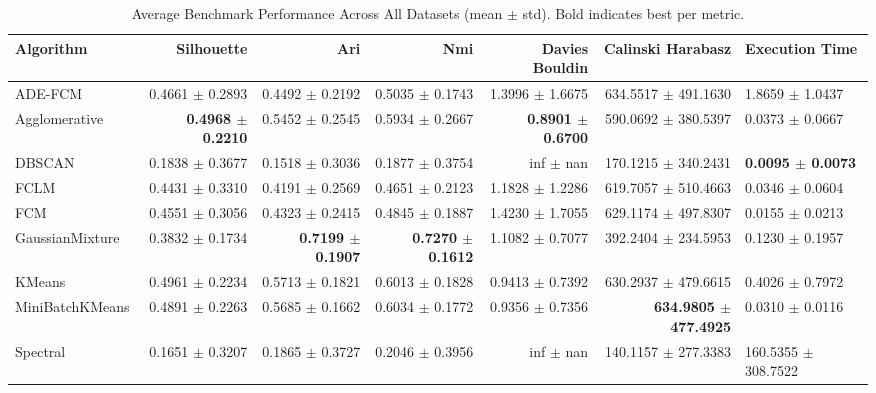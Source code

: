 \begin{table}[htbp]
\centering
\caption{Average Benchmark Performance Across All Datasets (mean $\pm$ std). Bold indicates best per metric.}
\label{tab:benchmark_avg}
\small
\begin{tabular}{lrrrrr}
\toprule
Algorithm & Silhouette & Ari & Nmi & Davies Bouldin & Calinski Harabasz & Execution Time \\
\midrule
ADE-FCM & 0.4661 $\pm$ 0.2893 & 0.4492 $\pm$ 0.2192 & 0.5035 $\pm$ 0.1743 & 1.3996 $\pm$ 1.6675 & 634.5517 $\pm$ 491.1630 & 1.8659 $\pm$ 1.0437 \\
Agglomerative & \textbf{0.4968 $\pm$ 0.2210} & 0.5452 $\pm$ 0.2545 & 0.5934 $\pm$ 0.2667 & \textbf{0.8901 $\pm$ 0.6700} & 590.0692 $\pm$ 380.5397 & 0.0373 $\pm$ 0.0667 \\
DBSCAN & 0.1838 $\pm$ 0.3677 & 0.1518 $\pm$ 0.3036 & 0.1877 $\pm$ 0.3754 & inf $\pm$ nan & 170.1215 $\pm$ 340.2431 & \textbf{0.0095 $\pm$ 0.0073} \\
FCLM & 0.4431 $\pm$ 0.3310 & 0.4191 $\pm$ 0.2569 & 0.4651 $\pm$ 0.2123 & 1.1828 $\pm$ 1.2286 & 619.7057 $\pm$ 510.4663 & 0.0346 $\pm$ 0.0604 \\
FCM & 0.4551 $\pm$ 0.3056 & 0.4323 $\pm$ 0.2415 & 0.4845 $\pm$ 0.1887 & 1.4230 $\pm$ 1.7055 & 629.1174 $\pm$ 497.8307 & 0.0155 $\pm$ 0.0213 \\
GaussianMixture & 0.3832 $\pm$ 0.1734 & \textbf{0.7199 $\pm$ 0.1907} & \textbf{0.7270 $\pm$ 0.1612} & 1.1082 $\pm$ 0.7077 & 392.2404 $\pm$ 234.5953 & 0.1230 $\pm$ 0.1957 \\
KMeans & 0.4961 $\pm$ 0.2234 & 0.5713 $\pm$ 0.1821 & 0.6013 $\pm$ 0.1828 & 0.9413 $\pm$ 0.7392 & 630.2937 $\pm$ 479.6615 & 0.4026 $\pm$ 0.7972 \\
MiniBatchKMeans & 0.4891 $\pm$ 0.2263 & 0.5685 $\pm$ 0.1662 & 0.6034 $\pm$ 0.1772 & 0.9356 $\pm$ 0.7356 & \textbf{634.9805 $\pm$ 477.4925} & 0.0310 $\pm$ 0.0116 \\
Spectral & 0.1651 $\pm$ 0.3207 & 0.1865 $\pm$ 0.3727 & 0.2046 $\pm$ 0.3956 & inf $\pm$ nan & 140.1157 $\pm$ 277.3383 & 160.5355 $\pm$ 308.7522 \\
\bottomrule
\end{tabular}
\end{table}